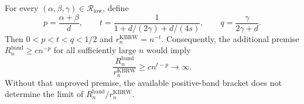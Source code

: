 For every \((\alpha,\beta,\gamma)\in\mathcal R_{\mathrm{low}}\), define
\[
p=\frac{\alpha+\beta}{d},\qquad
t=\frac{1}{1+d/(2\gamma)+d/(4s)},\qquad
q=\frac{\gamma}{2\gamma+d}.
\]
Then \(0<p<t<q<1/2\) and \(r_n^{\mathrm{KBRW}}=n^{-t}\).  Consequently, the additional premise \(R_n^{\mathrm{band}}\geq c n^{-p}\) for all sufficiently large \(n\) would imply
\[
\frac{R_n^{\mathrm{band}}}{r_n^{\mathrm{KBRW}}}
\geq c n^{t-p}\longrightarrow\infty.
\]
Without that unproved premise, the available positive-band bracket does not determine the limit of \(R_n^{\mathrm{band}}/r_n^{\mathrm{KBRW}}\).